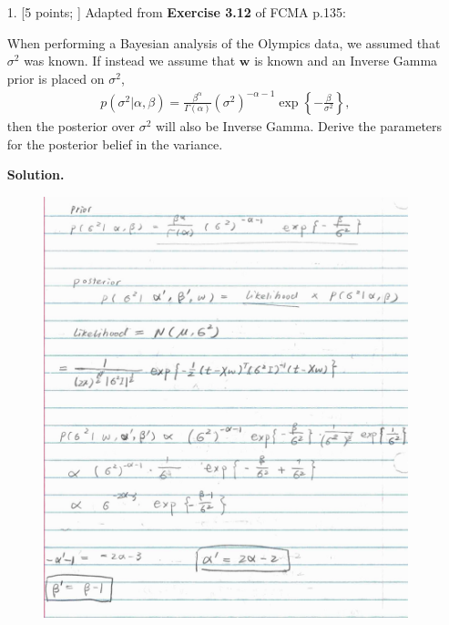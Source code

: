 \documentclass[10pt]{article}
\begin{document}
\newpage
\begin{itemize}

\item[1.]  [5 points; \boldred{Required only for Graduates}]
Adapted from {\bf Exercise 3.12} of FCMA p.135:

When performing a Bayesian analysis of the Olympics data, we assumed that $\sigma^2$ was known.  If instead we assume that $\mathbf{w}$ is known and an Inverse Gamma prior is placed on $\sigma^2$,
\begin{eqnarray*}
p(\sigma^2 | \alpha, \beta) = \frac{\beta^{\alpha}}{\Gamma(\alpha)} (\sigma^2)^{-\alpha-1} \exp \left\{-\frac{\beta}{\sigma^2} \right\},
\end{eqnarray*}
then the posterior over $\sigma^2$ will also be Inverse Gamma. Derive the parameters for the posterior belief in the variance.  

{\bf Solution.}
\FloatBarrier
\begin{figure}[h!]
\centering
\includegraphics[width=1\linewidth]{figures/HW4_1.jpeg}
\end{figure}
\FloatBarrier


\end{itemize}
\end{document}
